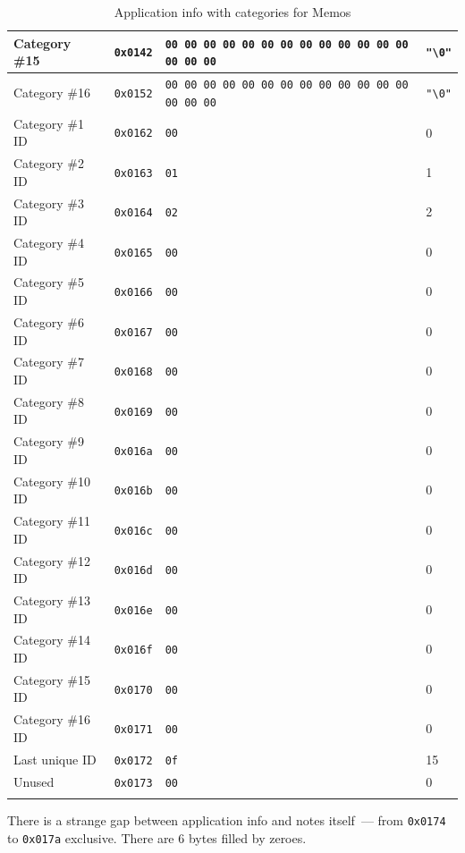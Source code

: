 \documentclass[a4paper,12pt,oneside]{scrartcl}
\begin{document}
\begin{longtable}{|p{3cm}|l|p{3cm}|p{5cm}|}
  \hline
  Category \#15 & \texttt{0x0142} & \texttt{00 00 00 00 00 00 00 00 00 00 00 00 00 00 00 00} & \texttt{"\textbackslash{}0"} \\
  \hline
  Category \#16 & \texttt{0x0152} & \texttt{00 00 00 00 00 00 00 00 00 00 00 00 00 00 00 00} & \texttt{"\textbackslash{}0"} \\
  \hline
  Category \#1 ID & \texttt{0x0162} & \texttt{00} & 0 \\
  \hline
  Category \#2 ID & \texttt{0x0163} & \texttt{01} & 1 \\
  \hline
  Category \#3 ID & \texttt{0x0164} & \texttt{02} & 2 \\
  \hline
  Category \#4 ID & \texttt{0x0165} & \texttt{00} & 0 \\
  \hline
  Category \#5 ID & \texttt{0x0166} & \texttt{00} & 0 \\
  \hline
  Category \#6 ID & \texttt{0x0167} & \texttt{00} & 0 \\
  \hline
  Category \#7 ID & \texttt{0x0168} & \texttt{00} & 0 \\
  \hline
  Category \#8 ID & \texttt{0x0169} & \texttt{00} & 0 \\
  \hline
  Category \#9 ID & \texttt{0x016a} & \texttt{00} & 0 \\
  \hline
  Category \#10 ID & \texttt{0x016b} & \texttt{00} & 0 \\
  \hline
  Category \#11 ID & \texttt{0x016c} & \texttt{00} & 0 \\
  \hline
  Category \#12 ID & \texttt{0x016d} & \texttt{00} & 0 \\
  \hline
  Category \#13 ID & \texttt{0x016e} & \texttt{00} & 0 \\
  \hline
  Category \#14 ID & \texttt{0x016f} & \texttt{00} & 0 \\
  \hline
  Category \#15 ID & \texttt{0x0170} & \texttt{00} & 0 \\
  \hline
  Category \#16 ID & \texttt{0x0171} & \texttt{00} & 0 \\
  \hline
  Last unique ID & \texttt{0x0172} & \texttt{0f} & 15 \\
  \hline
  Unused & \texttt{0x0173} & \texttt{00} & 0 \\
  \hline
  \caption{Application info with categories for Memos}
  \label{tab:memo-categories}
\end{longtable}

There is a strange gap between application info and notes itself~--- from
\texttt{0x0174} to \texttt{0x017a} exclusive. There are 6 bytes filled by
zeroes.
\end{document}
